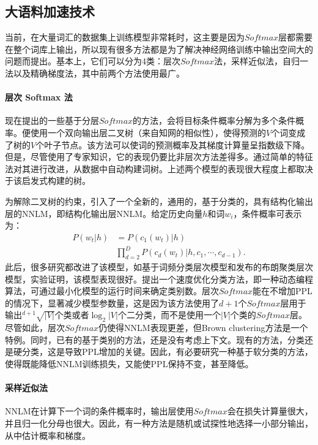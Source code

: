 \documentclass[a4paper, 12pt, twocolumn]{article}
\begin{document}
\subsection{大语料加速技术}
当前，在大量词汇的数据集上训练模型非常耗时，这主要是因为$Softmax$层都需要在整个词库上输出，所以现有很多方法都是为了解决神经网络训练中输出空间大的问题而提出。基本上，它们可以分为4类：层次$Softmax$法，采样近似法，自归一法以及精确梯度法，其中前两个方法使用最广。

\paragraph{层次 Softmax 法}
现在提出的一些基于分层$Softmax$的方法，会将目标条件概率分解为多个条件概率。\cite{morin2005hierarchical}便使用一个双向输出层二叉树（来自知网的相似性），使得预测的$V$个词变成了树的$V$个叶子节点。该方法可以使词的预测概率及其梯度计算量呈指数级下降。但是，尽管使用了专家知识，它的表现仍要比非层次方法差得多。\cite{mnih2009scalable}通过简单的特征法对其进行改进，从数据中自动构建词树。上述两个模型的表现很大程度上都取决于该启发式构建的树。

为解除二叉树的约束，\cite{le2012structured}引入了一个全新的，通用的，基于分类的，具有结构化输出层的NNLM，即结构化输出层NNLM。给定历史向量$h$和词$w_i$，条件概率可表示为：
\begin{equation}
  \begin{aligned}
    P(w_t|h) &=P(c_1(w_t)|h) \\ &\prod _{d=2}^D P(c_d(w_t)|h,c_1,\cdots,c_{d-1}).
  \end{aligned}
  \label{eq:9}
\end{equation}
此后，很多研究都改进了该模型，如基于词频分类层次模型和\cite{si2012impact}发布的布朗聚类层次模型，实验证明，该模型表现很好。\cite{zweig2013speed}提出一个速度优化分类方法，即一种动态编程算法，可通过最小化模型的运行时间来确定类别数。层次$Softmax$能在不增加PPL的情况下，显著减少模型参数量，这是因为该方法使用了$d+1$个$Softmax$层用于输出$^{d+1}\sqrt{|V|}$个类或者$\log_2 |V|$个二分类，而不是使用一个$|V|$个类的$Softmax$层。尽管如此，层次$Softmax$仍使得NNLM表现更差，但Brown clustering方法是一个特例。同时，已有的基于类别的方法，还是没有考虑上下文。现有的方法，分类还是硬分类，这是导致PPL增加的关键。因此，有必要研究一种基于软分类的方法，使得既能降低NNLM训练损失，又能使PPL保持不变，甚至降低。

\paragraph{采样近似法}
NNLM在计算下一个词的条件概率时，输出层使用$Softmax$会在损失计算量很大，并且归一化分母也很大。因此，有一种方法是随机或试探性地选择一小部分输出，从中估计概率和梯度。
\end{document}
